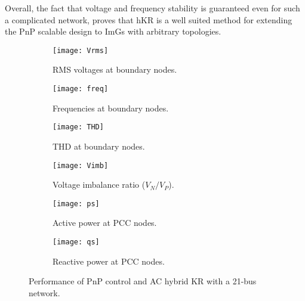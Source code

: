 \documentclass[a4paper]{article}
\theoremstyle{plain}
\begin{document}
Overall, the fact that voltage and frequency stability is guaranteed
even for such a complicated network, proves that hKR is
a well suited method for extending the PnP scalable design to ImGs
with arbitrary topologies.
 \begin{figure}[htb]
                      \centering
                      \begin{subfigure}[htb]{0.48\textwidth}
                        \centering
                        \texttt{[image: Vrms]}
                        \caption{RMS voltages at boundary nodes.}
                        \label{fig:21nodes_RMS}
                      \end{subfigure}
                      \begin{subfigure}[htb]{0.48\textwidth}
                        \centering
                        \texttt{[image: freq]}
                        \caption{Frequencies at boundary nodes.}
                        \label{fig:21nodes_f}
                      \end{subfigure}
                      \begin{subfigure}[htb]{0.48\textwidth}
                        \centering
                        \texttt{[image: THD]}
                        \caption{THD at boundary nodes.}
                        \label{fig:21nodes_THD}
                      \end{subfigure}
                      \begin{subfigure}[htb]{0.48\textwidth}
                        \centering
                        \texttt{[image: Vimb]}
                        \caption{Voltage imbalance ratio ($V_{N}/V_{P}$).}
                        \label{fig:21nodes_Vimb}
                      \end{subfigure}
                      \begin{subfigure}[htb]{0.48\textwidth}
                        \centering
                        \texttt{[image: ps]}
                        \caption{Active power at PCC nodes.}
                        \label{fig:21nodes_ps}
                      \end{subfigure}
                      \begin{subfigure}[htb]{0.48\textwidth}
                        \centering
                        \texttt{[image: qs]}
                        \caption{Reactive power at PCC nodes.}
                        \label{fig:21nodes_qs}
                      \end{subfigure}
                      \caption{Performance of PnP control and AC
                        hybrid KR with a 21-bus network.}
                      \label{fig:21nodes_performance}
                    \end{figure}
\end{document}
